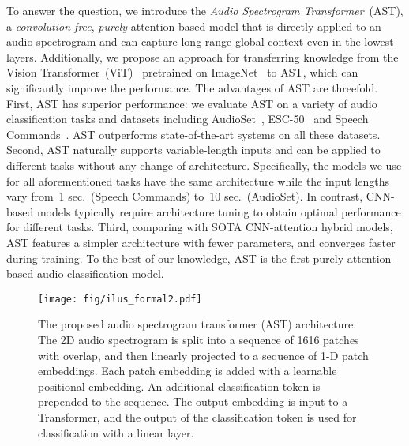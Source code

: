 \documentclass[a4paper]{article}
\newcommand{\squeezeup}{\vspace{-2.0mm}}
\begin{document}
To answer the question, we introduce the \emph{Audio Spectrogram Transformer}~(AST), a \emph{convolution-free}, \emph{purely} attention-based model that is directly applied to an audio spectrogram and can capture long-range global context even in the lowest layers. 
Additionally, we propose an approach for transferring knowledge from the Vision Transformer~(ViT)~\cite{touvron2020deit} pretrained on ImageNet~\cite{deng2009imagenet} to AST, which can significantly improve the performance.
The advantages of AST are threefold.
First, AST has superior performance: we evaluate AST on a variety of audio classification tasks and datasets including AudioSet~\cite{gemmeke2017audio}, ESC-50~\cite{piczak2015esc} and Speech Commands~\cite{warden2018speech}.
AST outperforms state-of-the-art systems on all these datasets.
Second, AST naturally supports variable-length inputs and can be applied to different tasks without any change of architecture.
Specifically, the models we use for all aforementioned tasks have the same architecture while the input lengths vary from~1 sec.~(Speech Commands) to~10 sec.~(AudioSet).
In contrast, CNN-based models typically require architecture tuning to obtain optimal performance for different tasks.
Third, comparing with SOTA CNN-attention hybrid models, AST features a simpler architecture with fewer parameters, and converges faster during training.
To the best of our knowledge, AST is the first purely attention-based audio classification model.

\begin{figure}[t]
  \centering
  \texttt{[image: fig/ilus\_formal2.pdf]}
  \caption{The proposed audio spectrogram transformer (AST) architecture. The 2D audio spectrogram is split into a sequence of 1616 patches with overlap, and then linearly projected to a sequence of 1-D patch embeddings. Each patch embedding is added with a learnable positional embedding. An additional classification token is prepended to the sequence. The output embedding is input to a Transformer, and the output of the classification token is used for classification with a linear layer.}
  \label{fig:arc}
  \squeezeup \squeezeup
\end{figure}
\end{document}
